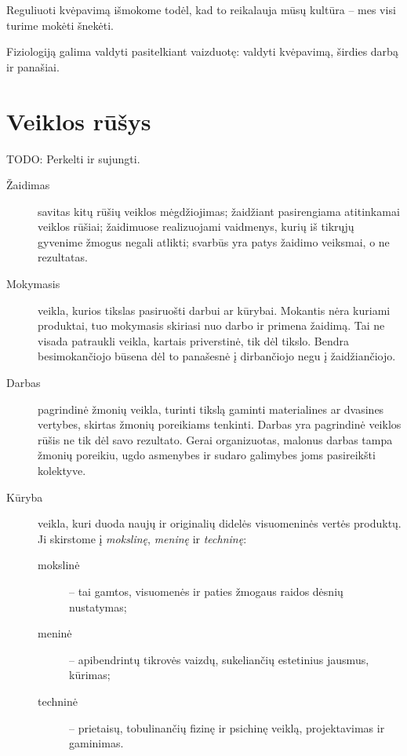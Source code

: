 Reguliuoti kvėpavimą išmokome todėl, kad to reikalauja mūsų kultūra – mes
visi turime mokėti šnekėti.

Fiziologiją galima valdyti pasitelkiant vaizduotę: valdyti kvėpavimą, 
širdies darbą ir panašiai.

\section{Veiklos rūšys}

\label{tema:veiklos_rusys}

TODO: Perkelti ir sujungti.

\begin{description}
  \item[Žaidimas] savitas kitų rūšių veiklos mėgdžiojimas; žaidžiant 
    pasirengiama atitinkamai veiklos rūšiai; žaidimuose realizuojami 
    vaidmenys, kurių iš tikrųjų gyvenime žmogus negali atlikti; svarbūs yra 
    patys žaidimo veiksmai, o ne rezultatas.
  \item[Mokymasis] veikla, kurios tikslas pasiruošti darbui ar kūrybai.  
    Mokantis nėra kuriami produktai, tuo mokymasis skiriasi nuo darbo ir 
    primena žaidimą. Tai ne visada patraukli veikla, kartais priverstinė, 
    tik dėl tikslo. Bendra besimokančiojo būsena dėl to panašesnė į 
    dirbančiojo negu į žaidžiančiojo.
  \item[Darbas] pagrindinė žmonių veikla, turinti tikslą gaminti 
    materialines ar dvasines vertybes, skirtas žmonių poreikiams tenkinti. 
    Darbas yra pagrindinė veiklos rūšis ne tik dėl savo rezultato. Gerai 
    organizuotas, malonus darbas tampa žmonių poreikiu, ugdo asmenybes ir 
    sudaro galimybes joms pasireikšti kolektyve.
  \item[Kūryba] veikla, kuri duoda naujų ir originalių didelės visuomeninės 
    vertės produktų. Ji skirstome į \emph{mokslinę}, \emph{meninę} ir 
    \emph{techninę}: 
    \begin{description}
      \item[mokslinė] – tai gamtos, visuomenės ir paties žmogaus raidos 
        dėsnių nustatymas;
      \item[meninė] – apibendrintų tikrovės vaizdų, sukeliančių
        estetinius jausmus, kūrimas;
      \item[techninė] – prietaisų, tobulinančių fizinę ir psichinę veiklą, 
        projektavimas ir gaminimas.
    \end{description}
\end{description}

